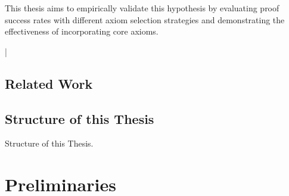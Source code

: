 \documentclass[english,version-2020-11]{uzl-thesis}
\begin{document}
  This thesis aims to empirically validate this hypothesis by evaluating proof success rates with different axiom selection strategies and demonstrating the effectiveness of incorporating core axioms.


\lstMakeShortInline[style=code,style=inline,language={[LaTeX]tex},moretexcs={chapter}]|


\section{Related Work}
  \cite{Schon2024}
  \cite{Àlvez2014}
  \cite{Hoder2011}
  \cite{Roederer2009}
  \cite{Sutcliffe2007}
%


\section{Structure of this Thesis}


Structure of this Thesis.



%

\chapter{Preliminaries}
\label{chapter-use}
\end{document}

